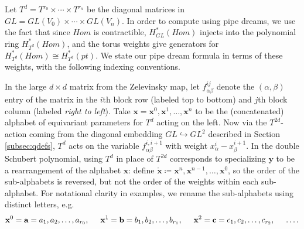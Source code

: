 \documentclass[reqno]{amsart}
\numberwithin{equation}{section}
\theoremstyle{definition}
\theoremstyle{remark}
\begin{document}
Let $T^d=T^{r_0} \times \cdots \times T^{r_n}$ be the diagonal matrices in $GL=GL(V_0) \times \cdots \times GL(V_n)$. In order to compute using pipe dreams, we use the fact that since $Hom$ is contractible, $H^*_{GL}(Hom)$ injects into the polynomial ring $H^*_{T^{d}}(Hom)$, and the torus weights give generators for $H^*_{T^{d}}(Hom) \cong H^*_{T^{d}}(pt)$. We state our pipe dream formula in terms of these weights, with the following indexing conventions. 

In the large $d \times d$ matrix from the Zelevinsky map, let $f^{ij}_{\alpha\beta}$ denote the $(\alpha,\beta)$ entry of the matrix in the $i$th block row (labeled top to bottom) and $j$th block column (labeled \emph{right to left}).
Take $\mathbf{x}=\mathbf{x}^0,\mathbf{x}^1,\dots,\mathbf{x}^n$ to be the (concatenated) alphabet of equivariant parameters for $T^d$ acting on the left. Now via the $T^{2d}$-action coming from the diagonal embedding $GL \hookrightarrow GL^2$ described in Section \ref{subsec:qdefs}, $T^d$ acts on the variable $f_{\alpha \beta}^{i,i+1}$ with weight $x_{\alpha}^{i}-x_\beta^{i+1}$. In the double Schubert polynomial, using $T^d$ in place of $T^{2d}$ corresponds to specializing $\mathbf{y}$ to be a rearrangement of the alphabet $\mathbf{x}$: define $\mathring{\mathbf{x}}\coloneqq \mathbf{x}^n,\mathbf{x}^{n-1},\dots,\mathbf{x}^0$, so the order of the sub-alphabets is reversed, but not the order of the weights within each sub-alphabet. For notational clarity in examples, we rename the sub-alphabets using distinct letters, e.g.
\[\mathbf{x}^0=\mathbf{a}=a_1,a_2,\dots,a_{r_0},\hspace{.5cm}\mathbf{x}^1=\mathbf{b}=b_1,b_2,\dots,b_{r_1},\hspace{.5cm}\mathbf{x}^2=\mathbf{c}=c_1,c_2,\dots,c_{r_2},\hspace{.5cm} \dots.\]
\end{document}
